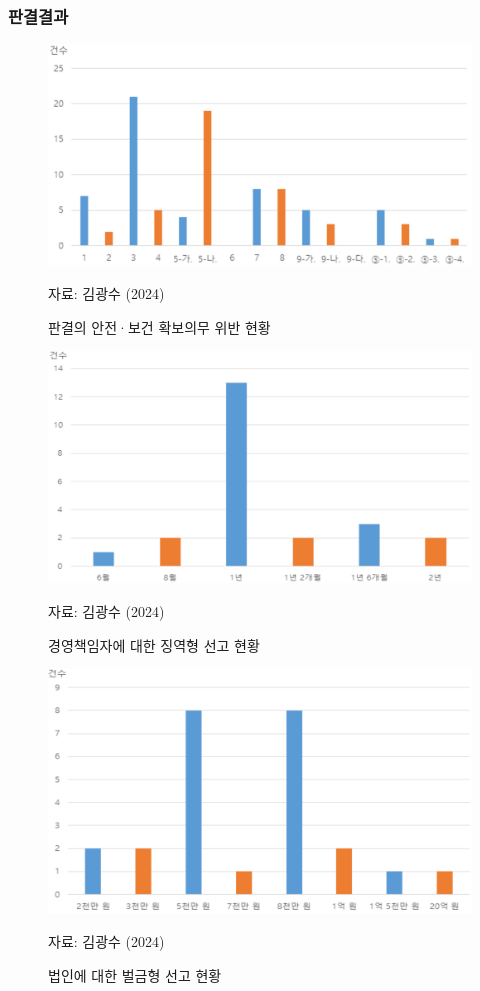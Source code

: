 \documentclass[aspectratio=169,xcolor=dvipsnames,handout]{beamer}
\begin{document}
\begin{frame}[allowframebreaks]
    \frametitle{판결결과}
    \centering
    \begin{figure}
        \includegraphics[width=.6\textwidth]{pic/판결의무기준}
        \\
        \raggedright%
        \hspace{1em}
        \tiny{자료: 김광수 (2024)} 
        \caption{판결의 안전·보건 확보의무 위반 현황}
    \end{figure}
\framebreak%
    \centering
    \begin{figure}
        \includegraphics[width=.6\textwidth]{pic/경영책임자징역형}
        \\
        \raggedright%
        \hspace{1em}
        \tiny{자료: 김광수 (2024)} 
        \caption{경영책임자에 대한 징역형 선고 현황}
    \end{figure}
\framebreak%
    \centering
    \begin{figure}
        \includegraphics[width=.6\textwidth]{pic/법인벌금형}
        \\
        \raggedright%
        \hspace{1em}
        \tiny{자료: 김광수 (2024)} 
        \caption{법인에 대한 벌금형 선고 현황}
    \end{figure}
\end{frame}
\end{document}
